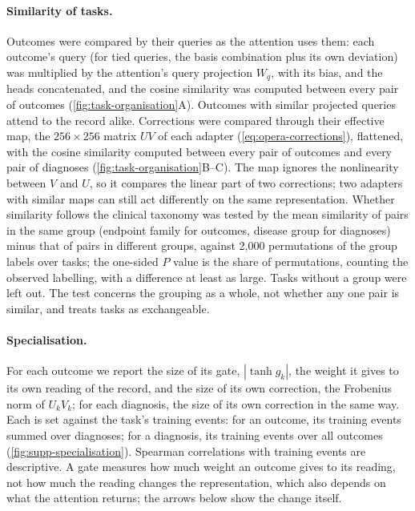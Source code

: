 \paragraph{Similarity of tasks.} Outcomes were compared by their queries as the
attention uses them: each outcome's query (for tied queries, the basis
combination plus its own deviation) was multiplied by the attention's query
projection $W_q$, with its bias, and the heads concatenated, and the cosine
similarity was computed between every pair of outcomes
(\cref{fig:task-organisation}A). Outcomes with similar projected queries attend
to the record alike. Corrections were compared through their effective map,
the $256\times256$ matrix $U V$ of each adapter (\cref{eq:opera-corrections}),
flattened, with the cosine similarity computed between every pair of outcomes
and every pair of diagnoses (\cref{fig:task-organisation}B--C). The map
ignores the nonlinearity between $V$ and $U$, so it compares the linear part of
two corrections; two adapters with similar maps can still act differently on
the same representation. Whether similarity follows the clinical taxonomy was
tested by the mean similarity of pairs in the same group (endpoint family for
outcomes, disease group for diagnoses) minus that of pairs in different groups,
against 2,000 permutations of the group labels over tasks; the one-sided $P$
value is the share of permutations, counting the observed labelling, with a
difference at least as large. Tasks without a group were left out. The test
concerns the grouping as a whole, not whether any one pair is similar, and
treats tasks as exchangeable.

\paragraph{Specialisation.} For each outcome we report the size of its gate,
$|\tanh g_k|$, the weight it gives to its own reading of the record, and the
size of its own correction, the Frobenius norm of $U_kV_k$; for each diagnosis,
the size of its own correction in the same way. Each is set against the task's
training events: for an outcome, its training events summed over diagnoses; for
a diagnosis, its training events over all outcomes
(\cref{fig:supp-specialisation}). Spearman correlations with training events are
descriptive. A gate measures how much weight an outcome gives to its reading,
not how much the reading changes the representation, which also depends on what
the attention returns; the arrows below show the change itself.

